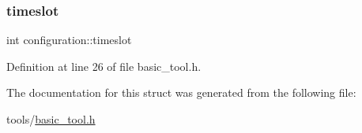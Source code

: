 \subsubsection{\texorpdfstring{timeslot}{timeslot}}
{\footnotesize\ttfamily int configuration\+::timeslot}



Definition at line 26 of file basic\+\_\+tool.\+h.



The documentation for this struct was generated from the following file\+:\begin{DoxyCompactItemize}
\item 
tools/\hyperlink{basic__tool_8h}{basic\+\_\+tool.\+h}\end{DoxyCompactItemize}
